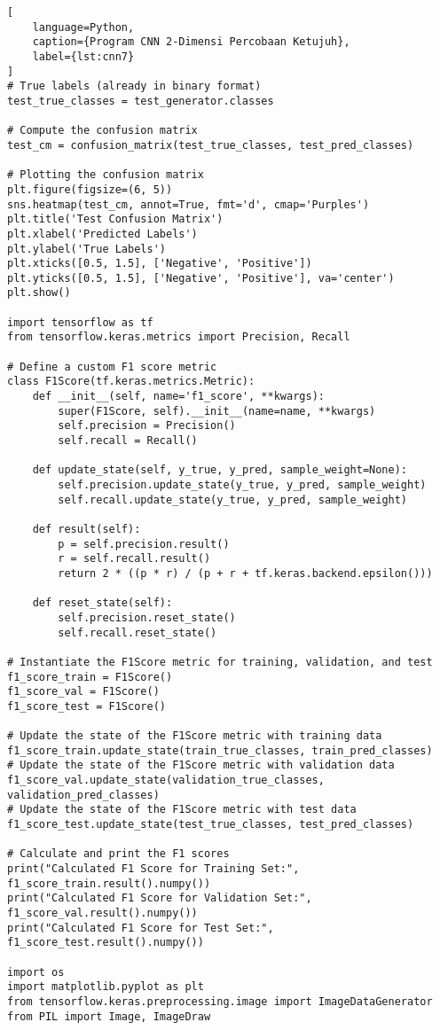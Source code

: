 \begin{lstlisting}[
    language=Python,
    caption={Program CNN 2-Dimensi Percobaan Ketujuh},
    label={lst:cnn7}
]
# True labels (already in binary format)
test_true_classes = test_generator.classes

# Compute the confusion matrix
test_cm = confusion_matrix(test_true_classes, test_pred_classes)

# Plotting the confusion matrix
plt.figure(figsize=(6, 5))
sns.heatmap(test_cm, annot=True, fmt='d', cmap='Purples')
plt.title('Test Confusion Matrix')
plt.xlabel('Predicted Labels')
plt.ylabel('True Labels')
plt.xticks([0.5, 1.5], ['Negative', 'Positive'])
plt.yticks([0.5, 1.5], ['Negative', 'Positive'], va='center')
plt.show()

import tensorflow as tf
from tensorflow.keras.metrics import Precision, Recall

# Define a custom F1 score metric
class F1Score(tf.keras.metrics.Metric):
    def __init__(self, name='f1_score', **kwargs):
        super(F1Score, self).__init__(name=name, **kwargs)
        self.precision = Precision()
        self.recall = Recall()

    def update_state(self, y_true, y_pred, sample_weight=None):
        self.precision.update_state(y_true, y_pred, sample_weight)
        self.recall.update_state(y_true, y_pred, sample_weight)

    def result(self):
        p = self.precision.result()
        r = self.recall.result()
        return 2 * ((p * r) / (p + r + tf.keras.backend.epsilon()))

    def reset_state(self):
        self.precision.reset_state()
        self.recall.reset_state()

# Instantiate the F1Score metric for training, validation, and test
f1_score_train = F1Score()
f1_score_val = F1Score()
f1_score_test = F1Score()

# Update the state of the F1Score metric with training data
f1_score_train.update_state(train_true_classes, train_pred_classes)
# Update the state of the F1Score metric with validation data
f1_score_val.update_state(validation_true_classes, validation_pred_classes)
# Update the state of the F1Score metric with test data
f1_score_test.update_state(test_true_classes, test_pred_classes)

# Calculate and print the F1 scores
print("Calculated F1 Score for Training Set:", f1_score_train.result().numpy())
print("Calculated F1 Score for Validation Set:", f1_score_val.result().numpy())
print("Calculated F1 Score for Test Set:", f1_score_test.result().numpy())

import os
import matplotlib.pyplot as plt
from tensorflow.keras.preprocessing.image import ImageDataGenerator
from PIL import Image, ImageDraw


\end{lstlisting}
